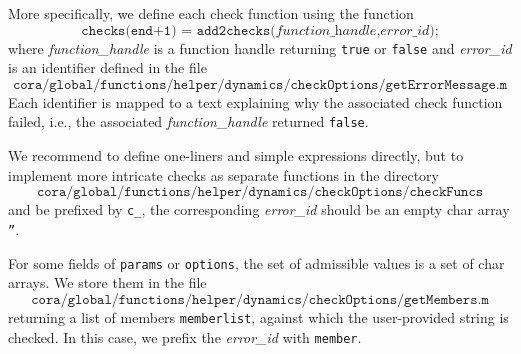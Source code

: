 More specifically, we define each check function using the function
\begin{equation*}
	\texttt{checks(end+1) = add2checks(}\textit{function\_handle}\texttt{,} \textit{error\_id}\texttt{);}
\end{equation*}
where \textit{function\_handle} is a function handle returning \texttt{true} or \texttt{false}
and \textit{error\_id} is an identifier defined in the file
\begin{equation*}
	\texttt{cora/global/functions/helper/dynamics/checkOptions/getErrorMessage.m}
\end{equation*}
Each identifier is mapped to a text explaining why the associated check function failed, i.e., the associated \textit{function\_handle} returned \texttt{false}.

We recommend to define one-liners and simple expressions directly, but to implement more intricate checks as separate functions in the directory
\begin{equation*}
	\texttt{cora/global/functions/helper/dynamics/checkOptions/checkFuncs}
\end{equation*}
and be prefixed by \texttt{c\_}, the corresponding \textit{error\_id} should be an empty char array \texttt{''}.

For some fields of \texttt{params} or \texttt{options}, the set of admissible values is a set of char arrays.
We store them in the file
\begin{equation*}
	\texttt{cora/global/functions/helper/dynamics/checkOptions/getMembers.m}
\end{equation*}
returning a list of members \texttt{memberlist}, against which the user-provided string is checked.
In this case, we prefix the \textit{error\_id} with \texttt{member}.



